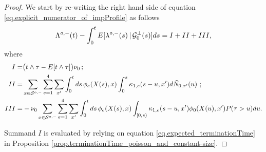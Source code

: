 \documentclass[10pt]{article}
\begin{document}
\begin{proof}
We start by re-writing the right hand side of equation \eqref{eq.explicit_numerator_of_impProfile} as follows
\begin{equation}\label{eq.proof_implementation_one-sided_impact}
 \Lambda^{o,-}(t) - \int_{0}^{t} {{E}}[\lambda_{}^{o,-}(s)\,\vert\,\mathcal{G}_{0}^{\perp}(s)]ds
 = I + II + III,
\end{equation}
where
\begin{equation*}
\begin{split}
 I =& 
 \big(t\wedge \tau - {{E}} [t\wedge\tau] \big) \nu_{0} \, ;
 \\
 II =&
 \sum_{x\in\mathcal{S}^{o,-}}\sum_{e=1}^{4}\sum_{x^{\prime}}
 \int_{0}^{t}  ds \, \phi_{e}(X(s),x)
 \int_{0}^{s}\kappa_{1,e}(s-u,x^{\prime}) 
 d\tilde{N}_{0,x^{\prime}}(u)\,\, ;
 \\
 III = &
 -\nu_{0}\sum_{x\in\mathcal{S}^{o,-}}\sum_{e=1}^{4}\sum_{x^{\prime}}
 \int_{0}^{t} ds \, \phi_{e}(X(s),x)
 \int_{[0,s)}
 \kappa_{1,e} (s-u,x^{\prime}) \phi_0(X(u),x^{\prime}){{P}}(\tau>u) du.
\end{split}
\end{equation*}

Summand $I$ is evaluated by relying on equation \eqref{eq.expected_terminationTime} in  Proposition \ref{prop.terminationTime_poisson_and_constant-size}. 


\end{proof}
\end{document}
